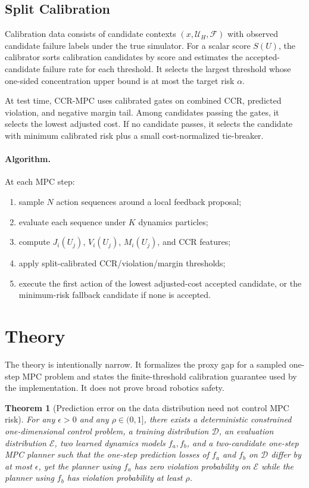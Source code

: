 \documentclass[11pt]{article}
\newtheorem{theorem}{Theorem}
\begin{document}
\subsection{Split Calibration}

Calibration data consists of candidate contexts $(x,\mathcal{U}_H,\mathcal{F})$ with observed candidate failure labels under the true simulator. For a scalar score $S(U)$, the calibrator sorts calibration candidates by score and estimates the accepted-candidate failure rate for each threshold. It selects the largest threshold whose one-sided concentration upper bound is at most the target risk $\alpha$.

At test time, CCR-MPC uses calibrated gates on combined CCR, predicted violation, and negative margin tail. Among candidates passing the gates, it selects the lowest adjusted cost. If no candidate passes, it selects the candidate with minimum calibrated risk plus a small cost-normalized tie-breaker.

\paragraph{Algorithm.}
At each MPC step:
\begin{enumerate}
  \item sample $N$ action sequences around a local feedback proposal;
  \item evaluate each sequence under $K$ dynamics particles;
  \item compute $J_i(U_j)$, $V_i(U_j)$, $M_i(U_j)$, and CCR features;
  \item apply split-calibrated CCR/violation/margin thresholds;
  \item execute the first action of the lowest adjusted-cost accepted candidate, or the minimum-risk fallback candidate if none is accepted.
\end{enumerate}

\section{Theory}

The theory is intentionally narrow. It formalizes the proxy gap for a sampled one-step MPC problem and states the finite-threshold calibration guarantee used by the implementation. It does not prove broad robotics safety.

\begin{theorem}[Prediction error on the data distribution need not control MPC risk]
For any $\epsilon>0$ and any $\rho\in(0,1]$, there exists a deterministic constrained one-dimensional control problem, a training distribution $\mathcal{D}$, an evaluation distribution $\mathcal{E}$, two learned dynamics models $f_a,f_b$, and a two-candidate one-step MPC planner such that the one-step prediction losses of $f_a$ and $f_b$ on $\mathcal{D}$ differ by at most $\epsilon$, yet the planner using $f_a$ has zero violation probability on $\mathcal{E}$ while the planner using $f_b$ has violation probability at least $\rho$.
\end{theorem}
\end{document}
